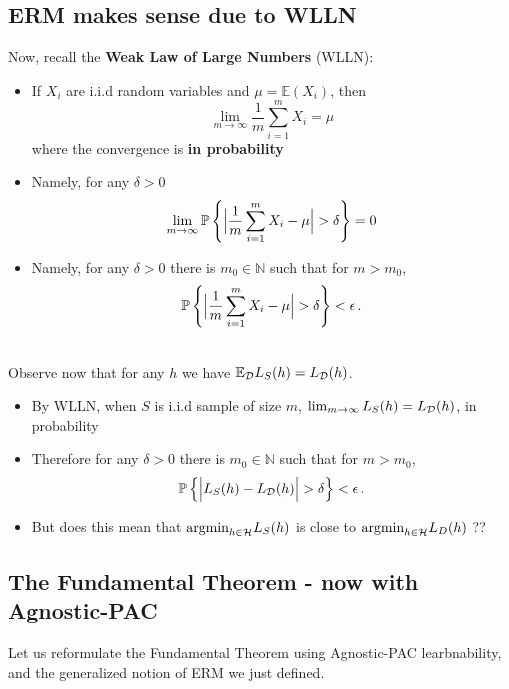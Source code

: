 \subsection{ERM makes sense due to WLLN}

Now, recall the {\bf Weak Law of Large Numbers} (WLLN):
\begin{itemize}
     \item  If $X_i$ are i.i.d
       random variables and $\mu=\mathbb{E}(X_i)$, then
       \[
	 \lim_{m\to\infty} \frac{1}{m}\sum_{i=1}^m X_i = \mu
       \]
       where the convergence is {\bf in probability}
     \item Namely, for any $\delta>0$
\[
  \lim_{m\to\infty} \prob\left\{ \Big|   \frac{1}{m}\sum_{i=1}^m X_i - \mu \Big|>\delta \right\} =0
\]
\item Namely, for any $\delta>0$ there is $m_0\in\mathbb{N}$ such that for $m>m_0$,
\[
  \prob\left\{ \Big|   \frac{1}{m}\sum_{i=1}^m X_i - \mu \Big|>\delta \right\} <
  \epsilon\,.
\]
   \end{itemize}
~\\
Observe now that for any $h$ we have $\mathbb{E}_{\mathcal{D}} L_S(h) = L_{\mathcal{D}}(h)$. 
\begin{itemize}
	\item By WLLN, when $S$ is i.i.d sample of size $m$, 
	  $\lim_{m\to\infty} L_S(h) = L_{\mathcal{D}}(h)$, in probability
	\item Therefore for any
 $\delta>0$ there is $m_0\in\mathbb{N}$ such that for $m>m_0$,
\[
  \prob\left\{ \Big| L_S(h) - L_\Dc(h)  \Big|>\delta \right\} <
  \epsilon\,.
\]
\item But does this mean that $ \text{argmin}_{h\in\mathcal{H}}L_S(h)$ is close to 
   $ \text{argmin}_{h\in\mathcal{H}}L_D(h)$ ??
\end{itemize}


\subsection{The Fundamental Theorem - now with Agnostic-PAC}

Let us reformulate the Fundamental Theorem using Agnostic-PAC learbnability, and
the generalized notion of ERM we just defined.

